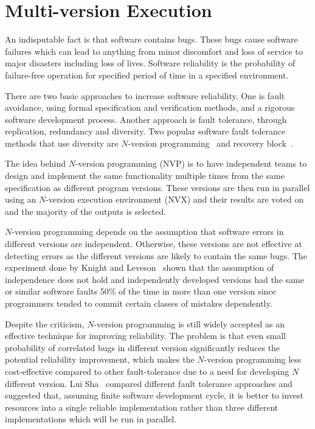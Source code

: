 \chapter{Multi-version Execution}
\label{chap:multi-version}

An indisputable fact is that software contains bugs. These bugs cause software
failures which can lead to anything from minor discomfort and loss of service
to major disasters including loss of lives. Software reliability is the
probability of failure-free operation for specified period of time in a
specified environment.

There are two basic approaches to increase software reliability. One is fault
avoidance, using formal specification and verification methods, and a rigorous
software development process. Another approach is fault tolerance, through
replication, redundancy and diversity. Two popular software fault tolerance
methods that use diversity are $N$-version programming~\cite{avizienis:nvp} and
recovery block~\cite{randell:rb}.


The idea behind $N$-version programming (NVP) is to have independent teams to
design and implement the same functionality multiple times from the same
specification as different program versions. These versions are then run in
parallel using an $N$-version execution environment (NVX) and their results are
voted on and the majority of the outputs is selected.

$N$-version programming depends on the assumption that software errors in
different versions are independent. Otherwise, these versions are not effective
at detecting errors as the different versions are likely to contain the same
bugs. The experiment done by Knight and Leveson~\cite{knight86,knight90} shown
that the assumption of independence does not hold and independently developed
versions had the same or similar software faults 50\% of the time in more than
one version since programmers tended to commit certain classes of mistakes
dependently.

Despite the criticism, $N$-version programming is still widely accepted as an
effective technique for improving reliability. The problem is that even small
probability of correlated bugs in different version significantly reduces the
potential reliability improvement, which makes the $N$-version programming less
cost-effective compared to other fault-tolerance due to a need for developing
$N$ different version. Lui Sha~\cite{lui01} compared different fault tolerance
approaches and suggested that, assuming finite software development cycle, it
is better to invest resources into a single reliable implementation rather than
three different implementations which will be run in parallel.


